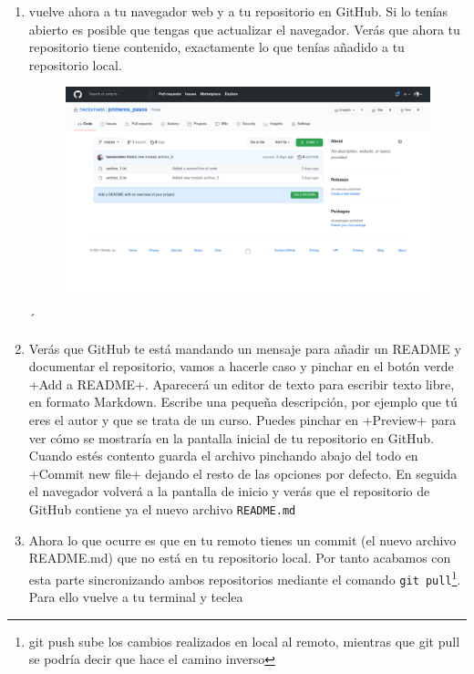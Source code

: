 \documentclass[a4paper,10pt]{article}
\begin{document}
\begin{enumerate}
      \item vuelve ahora a tu navegador web y a tu repositorio en GitHub. Si lo tenías abierto es posible que tengas que actualizar el navegador. Verás que ahora tu repositorio tiene contenido, exactamente lo que tenías añadido a tu repositorio local.
      
      \begin{figure}[H]
       \includegraphics[width=\textwidth]{github_add_readme.png}
      \end{figure}´
      
      \item Verás que GitHub te está mandando un mensaje para añadir un README y documentar el repositorio, vamos a hacerle caso y pinchar en el botón verde \cverb+Add a README+. Aparecerá un editor de texto para escribir texto libre, en formato Markdown. Escribe una pequeña descripción, por ejemplo que tú eres el autor y que se trata de un curso. Puedes pinchar en \cverb+Preview+ para ver cómo se mostraría en la pantalla inicial de tu repositorio en GitHub. Cuando estés contento guarda el archivo pinchando abajo del todo en \cverb+Commit new file+ dejando el resto de las opciones por defecto. En seguida el navegador volverá a la pantalla de inicio y verás que el repositorio de GitHub contiene ya el nuevo archivo \verb+README.md+
      
      \item Ahora lo que ocurre es que en tu remoto tienes un commit (el nuevo archivo README.md) que no está en tu repositorio local. Por tanto acabamos con esta parte sincronizando ambos repositorios mediante el comando \verb+git pull+\footnote{git push sube los cambios realizados en local al remoto, mientras que git pull se podría decir que hace el camino inverso}. Para ello vuelve a tu terminal y teclea 
      

\end{enumerate}
\end{document}
